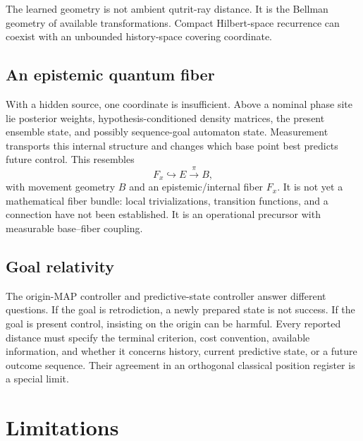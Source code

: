\documentclass[11pt]{article}
\theoremstyle{definition}\newtheorem{definition}[theorem]{Definition}
\theoremstyle{remark}\newtheorem{remark}[theorem]{Remark}
\begin{document}
The learned geometry is not ambient qutrit-ray distance. It is the Bellman
geometry of available transformations. Compact Hilbert-space recurrence can
coexist with an unbounded history-space covering coordinate.

\subsection{An epistemic quantum fiber}

With a hidden source, one coordinate is insufficient. Above a nominal phase
site lie posterior weights, hypothesis-conditioned density matrices, the
present ensemble state, and possibly sequence-goal automaton state.
Measurement transports this internal structure and changes which base point
best predicts future control. This resembles
\[
F_x\hookrightarrow E\xrightarrow{\pi}B,
\]
with movement geometry \(B\) and an epistemic/internal fiber \(F_x\).
It is not yet a mathematical fiber bundle: local trivializations, transition
functions, and a connection have not been established. It is an operational
precursor with measurable base--fiber coupling.

\subsection{Goal relativity}

The origin-MAP controller and predictive-state controller answer different
questions. If the goal is retrodiction, a newly prepared state is not success.
If the goal is present control, insisting on the origin can be harmful. Every
reported distance must specify the terminal criterion, cost convention,
available information, and whether it concerns history, current predictive
state, or a future outcome sequence. Their agreement in an orthogonal
classical position register is a special limit.

\section{Limitations}
\label{sec:limitations}
\end{document}
